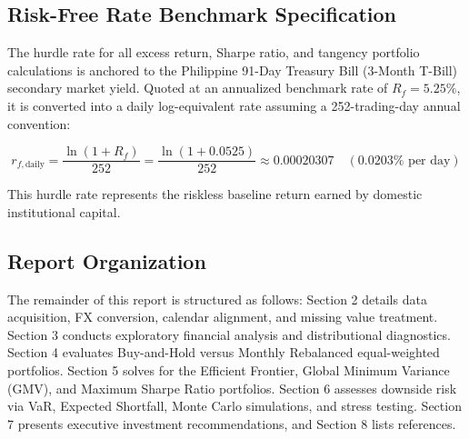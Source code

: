 \subsection{Risk-Free Rate Benchmark Specification}

The hurdle rate for all excess return, Sharpe ratio, and tangency portfolio calculations is anchored to the Philippine 91-Day Treasury Bill (3-Month T-Bill) secondary market yield. Quoted at an annualized benchmark rate of $R_f = 5.25\%$, it is converted into a daily log-equivalent rate assuming a 252-trading-day annual convention:

\begin{equation}
  r_{f,\text{daily}} = \frac{\ln(1 + R_f)}{252} = \frac{\ln(1 + 0.0525)}{252} \approx 0.00020307 \quad (0.0203\% \text{ per day})
\end{equation}

This hurdle rate represents the riskless baseline return earned by domestic institutional capital.

\subsection{Report Organization}

The remainder of this report is structured as follows: Section 2 details data acquisition, FX conversion, calendar alignment, and missing value treatment. Section 3 conducts exploratory financial analysis and distributional diagnostics. Section 4 evaluates Buy-and-Hold versus Monthly Rebalanced equal-weighted portfolios. Section 5 solves for the Efficient Frontier, Global Minimum Variance (GMV), and Maximum Sharpe Ratio portfolios. Section 6 assesses downside risk via VaR, Expected Shortfall, Monte Carlo simulations, and stress testing. Section 7 presents executive investment recommendations, and Section 8 lists references.

